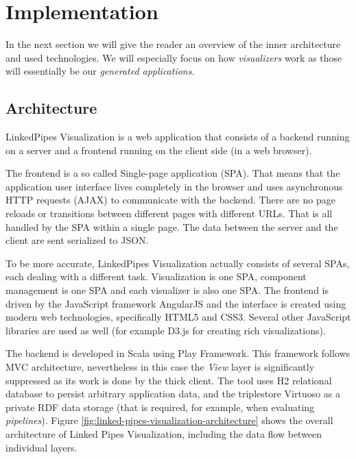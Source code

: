 \section{Implementation}

In the next section we will give the reader an overview of the inner architecture and used technologies. We will especially focus on how \emph{visualizers} work as those will essentially be our \emph{generated applications}.

\subsection{Architecture}
\label{sec:linkedpipes:architecture}

LinkedPipes Visualization is a web application that consists of a backend running on a server and a frontend running on the client side (in a web browser). 

The frontend is a so called Single-page application (SPA). That means that the application user interface lives completely in the browser and uses asynchronous HTTP requests (AJAX) to communicate with the backend. There are no page reloads or transitions between different pages with different URLs. That is all handled by the SPA within a single page. The data between the server and the client are sent serialized to JSON.

To be more accurate, LinkedPipes Visualization actually consists of several SPAs, each dealing with a different task. Visualization is one SPA, component management is one SPA and each visualizer is also one SPA. The frontend is driven by the JavaScript framework AngularJS and the interface is created using modern web technologies, specifically HTML5 and CSS3. Several other JavaScript libraries are used as well (for example D3.js for creating rich visualizations).

The backend is developed in Scala using Play Framework. This framework follows MVC architecture, nevertheless in this case the \emph{View} layer is significantly suppressed as its work is done by the thick client. The tool uses H2 relational database to persist arbitrary application data, and the triplestore Virtuoso as a private RDF data storage (that is required, for example, when evaluating \emph{pipelines}). Figure \ref{fig:linked-pipes-visualization-architecture} shows the overall architecture of Linked Pipes Visualization, including the data flow between individual layers.


